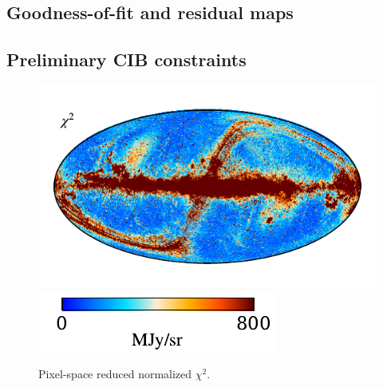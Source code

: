 \documentclass{aa}
\begin{document}
\subsection{Goodness-of-fit and residual maps}
\subsection{Preliminary CIB constraints}


\begin{figure}
	\centering
	\includegraphics{figs/chisq_c0001_000019.pdf}
	\includegraphics{figs/chisq_cbar_c0001_000019.pdf}
	\caption{Pixel-space reduced normalized $\chi^2$.}
	\label{fig:chisq}
\end{figure}
\end{document}
